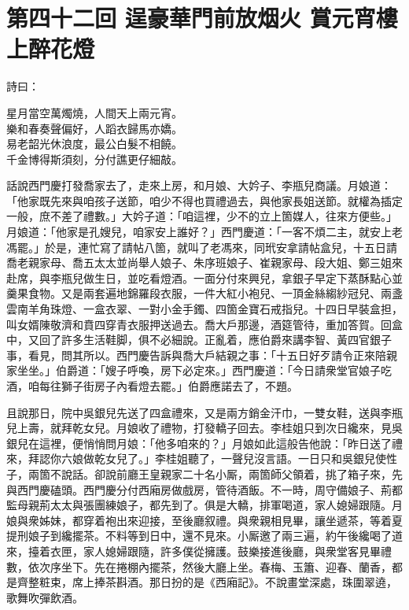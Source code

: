 
\chapter*{第四十二回 逞豪華門前放烟火 賞元宵樓上醉花燈}


詩曰：

\begin{myquote}
星月當空萬燭燒，人間天上兩元宵。\\樂和春奏聲偏好，人蹈衣歸馬亦嬌。\\易老韶光休浪度，最公白髮不相饒。\\千金博得斯須刻，分付譙更仔細敲。
\end{myquote}

話說西門慶打發喬家去了，走來上房，和月娘、大妗子、李瓶兒商議。月娘道：「他家既先來與咱孩子送節，咱少不得也買禮過去，與他家長姐送節。就權為插定一般，庶不差了禮數。」大妗子道：「咱這裡，少不的立上箇媒人，往來方便些。」月娘道：「他家是孔嫂兒，咱家安上誰好？」西門慶道：「一客不煩二主，就安上老馮罷。」於是，連忙寫了請帖八箇，就叫了老馮來，同玳安拿請帖盒兒，十五日請喬老親家母、喬五太太並尚舉人娘子、朱序班娘子、崔親家母、段大姐、鄭三姐來赴席，與李瓶兒做生日，並吃看燈酒。一面分付來興兒，拿銀子早定下蒸酥點心並羹果食物。又是兩套遍地錦羅段衣服，一件大紅小袍兒、一頂金絲縐紗冠兒、兩盞雲南羊角珠燈、一盒衣翠、一對小金手鐲、四箇金寶石戒指兒。十四日早裝盒担，叫女婿陳敬濟和賁四穿青衣服押送過去。喬大戶那邊，酒筵管待，重加答賀。回盒中，又回了許多生活鞋脚，俱不必細說。正亂着，應伯爵來講李智、黃四官銀子事，看見，問其所以。西門慶告訴與喬大戶結親之事：「十五日好歹請令正來陪親家坐坐。」伯爵道：「嫂子呼喚，房下必定來。」西門慶道：「今日請衆堂官娘子吃酒，咱每往獅子街房子內看燈去罷。」伯爵應諾去了，不題。

且說那日，院中吳銀兒先送了四盒禮來，又是兩方銷金汗巾，一雙女鞋，送與李瓶兒上壽，就拜乾女兒。月娘收了禮物，打發轎子回去。李桂姐只到次日纔來，見吳銀兒在這裡，便悄悄問月娘：「他多咱來的？」月娘如此這般告他說：「昨日送了禮來，拜認你六娘做乾女兒了。」李桂姐聽了，一聲兒沒言語。一日只和吳銀兒使性子，兩箇不說話。{}卻說前廳王皇親家二十名小厮，兩箇師父領着，挑了箱子來，先與西門慶磕頭。西門慶分付西廂房做戲房，管待酒飯。不一時，周守備娘子、荊都監母親荊太太與張團練娘子，都先到了。俱是大轎，排軍喝道，家人媳婦跟隨。月娘與衆姊妹，都穿着袍出來迎接，至後廳叙禮。與衆親相見畢，讓坐遞茶，等着夏提刑娘子到纔擺茶。不料等到日中，還不見來。小厮邀了兩三遍，約午後纔喝了道來，擡着衣匣，家人媳婦跟隨，許多僕從擁護。鼓樂接進後廳，與衆堂客見畢禮數，依次序坐下。先在捲棚內擺茶，然後大廳上坐。春梅、玉簫、迎春、蘭香，都是齊整粧束，席上捧茶斟酒。那日扮的是《西廂記》。不說畫堂深處，珠圍翠遶，歌舞吹彈飲酒。

